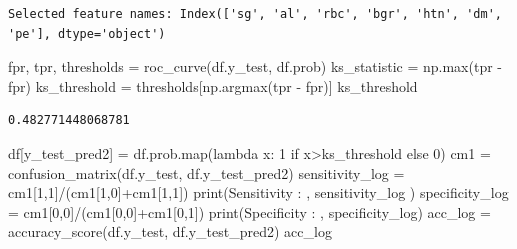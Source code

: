 \documentclass[
  11pt,
  letterpaper,
  DIV=11,
  numbers=noendperiod]{scrartcl}
\newenvironment{Shaded}{\begin{snugshade}}{\end{snugshade}}
\newcommand{\BuiltInTok}[1]{\textcolor[rgb]{0.00,0.23,0.31}{#1}}
\newcommand{\ControlFlowTok}[1]{\textcolor[rgb]{0.00,0.23,0.31}{#1}}
\newcommand{\DecValTok}[1]{\textcolor[rgb]{0.68,0.00,0.00}{#1}}
\newcommand{\KeywordTok}[1]{\textcolor[rgb]{0.00,0.23,0.31}{#1}}
\newcommand{\NormalTok}[1]{\textcolor[rgb]{0.00,0.23,0.31}{#1}}
\newcommand{\OperatorTok}[1]{\textcolor[rgb]{0.37,0.37,0.37}{#1}}
\newcommand{\StringTok}[1]{\textcolor[rgb]{0.13,0.47,0.30}{#1}}
\begin{document}
\begin{verbatim}
Selected feature names: Index(['sg', 'al', 'rbc', 'bgr', 'htn', 'dm', 'pe'], dtype='object')
\end{verbatim}

\begin{Shaded}
\begin{Highlighting}[]
\NormalTok{fpr, tpr, thresholds }\OperatorTok{=}\NormalTok{ roc\_curve(df.y\_test, df.prob)}
\NormalTok{ks\_statistic }\OperatorTok{=}\NormalTok{ np.}\BuiltInTok{max}\NormalTok{(tpr }\OperatorTok{{-}}\NormalTok{ fpr)}
\NormalTok{ks\_threshold }\OperatorTok{=}\NormalTok{ thresholds[np.argmax(tpr }\OperatorTok{{-}}\NormalTok{ fpr)]}
\NormalTok{ks\_threshold}
\end{Highlighting}
\end{Shaded}

\begin{verbatim}
0.482771448068781
\end{verbatim}

\begin{Shaded}
\begin{Highlighting}[]
\NormalTok{df[}\StringTok{\textquotesingle{}y\_test\_pred2\textquotesingle{}}\NormalTok{] }\OperatorTok{=}\NormalTok{ df.prob.}\BuiltInTok{map}\NormalTok{(}\KeywordTok{lambda}\NormalTok{ x: }\DecValTok{1} \ControlFlowTok{if}\NormalTok{ x}\OperatorTok{\textgreater{}}\NormalTok{ks\_threshold }\ControlFlowTok{else} \DecValTok{0}\NormalTok{)}
\NormalTok{cm1 }\OperatorTok{=}\NormalTok{ confusion\_matrix(df.y\_test, df.y\_test\_pred2)}
\NormalTok{sensitivity\_log }\OperatorTok{=}\NormalTok{ cm1[}\DecValTok{1}\NormalTok{,}\DecValTok{1}\NormalTok{]}\OperatorTok{/}\NormalTok{(cm1[}\DecValTok{1}\NormalTok{,}\DecValTok{0}\NormalTok{]}\OperatorTok{+}\NormalTok{cm1[}\DecValTok{1}\NormalTok{,}\DecValTok{1}\NormalTok{])}
\BuiltInTok{print}\NormalTok{(}\StringTok{\textquotesingle{}Sensitivity : \textquotesingle{}}\NormalTok{, sensitivity\_log )}
\NormalTok{specificity\_log }\OperatorTok{=}\NormalTok{ cm1[}\DecValTok{0}\NormalTok{,}\DecValTok{0}\NormalTok{]}\OperatorTok{/}\NormalTok{(cm1[}\DecValTok{0}\NormalTok{,}\DecValTok{0}\NormalTok{]}\OperatorTok{+}\NormalTok{cm1[}\DecValTok{0}\NormalTok{,}\DecValTok{1}\NormalTok{])}
\BuiltInTok{print}\NormalTok{(}\StringTok{\textquotesingle{}Specificity : \textquotesingle{}}\NormalTok{, specificity\_log)}
\NormalTok{acc\_log }\OperatorTok{=}\NormalTok{ accuracy\_score(df.y\_test, df.y\_test\_pred2)}
\NormalTok{acc\_log}
\end{Highlighting}
\end{Shaded}
\end{document}
